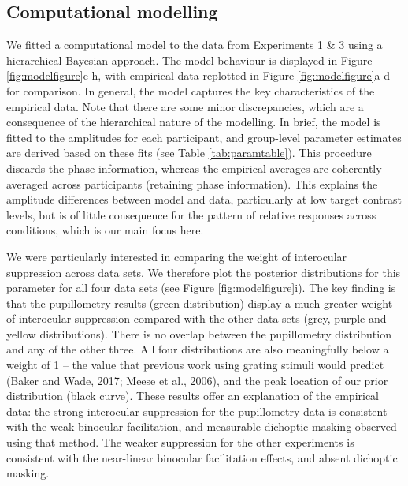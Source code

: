 \documentclass[
]{article}
\begin{document}
\hypertarget{computational-modelling}{%
\subsection{Computational modelling}\label{computational-modelling}}

We fitted a computational model to the data from Experiments 1 \& 3 using a hierarchical Bayesian approach. The model behaviour is displayed in Figure \ref{fig:modelfigure}e-h, with empirical data replotted in Figure \ref{fig:modelfigure}a-d for comparison. In general, the model captures the key characteristics of the empirical data. Note that there are some minor discrepancies, which are a consequence of the hierarchical nature of the modelling. In brief, the model is fitted to the amplitudes for each participant, and group-level parameter estimates are derived based on these fits (see Table \ref{tab:paramtable}). This procedure discards the phase information, whereas the empirical averages are coherently averaged across participants (retaining phase information). This explains the amplitude differences between model and data, particularly at low target contrast levels, but is of little consequence for the pattern of relative responses across conditions, which is our main focus here.

We were particularly interested in comparing the weight of interocular suppression across data sets. We therefore plot the posterior distributions for this parameter for all four data sets (see Figure \ref{fig:modelfigure}i). The key finding is that the pupillometry results (green distribution) display a much greater weight of interocular suppression compared with the other data sets (grey, purple and yellow distributions). There is no overlap between the pupillometry distribution and any of the other three. All four distributions are also meaningfully below a weight of 1 -- the value that previous work using grating stimuli would predict (Baker and Wade, 2017; Meese et al., 2006), and the peak location of our prior distribution (black curve). These results offer an explanation of the empirical data: the strong interocular suppression for the pupillometry data is consistent with the weak binocular facilitation, and measurable dichoptic masking observed using that method. The weaker suppression for the other experiments is consistent with the near-linear binocular facilitation effects, and absent dichoptic masking.
\end{document}
